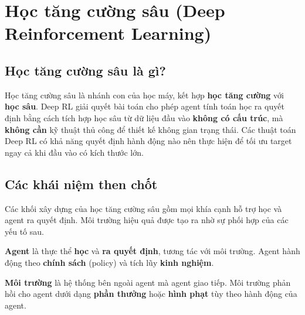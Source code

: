\section{Học tăng cường sâu (Deep Reinforcement Learning)}
\label{sec:deep-reinforcement-learning}

\subsection{Học tăng cường sâu là gì?}

\begin{dinhnghia}[title={Deep Reinforcement Learning (Deep RL)}]
Học tăng cường sâu là nhánh con của học máy, kết hợp \textbf{học tăng cường} với \textbf{học sâu}.
Deep RL giải quyết bài toán cho phép agent tính toán học ra quyết định bằng cách tích hợp học sâu từ dữ liệu đầu vào \textbf{không có cấu trúc}, mà \textbf{không cần} kỹ thuật thủ công để thiết kế không gian trạng thái.
Các thuật toán Deep RL có khả năng quyết định hành động nào nên thực hiện để tối ưu target ngay cả khi đầu vào có kích thước lớn.
\end{dinhnghia}

\subsection{Các khái niệm then chốt}

\begin{ynghia}[title={Khối xây dựng Deep RL}]
Các khối xây dựng của học tăng cường sâu gồm mọi khía cạnh hỗ trợ học và agent ra quyết định.
Môi trường hiệu quả được tạo ra nhờ sự phối hợp của các yếu tố sau.
\end{ynghia}

\begin{dinhnghia}[title={Agent (Tác tử)}]
\textbf{Agent} là thực thể \textbf{học} và \textbf{ra quyết định}, tương tác với môi trường.
Agent hành động theo \textbf{chính sách} (policy) và tích lũy \textbf{kinh nghiệm}.
\end{dinhnghia}

\begin{dinhnghia}[title={Environment (Môi trường)}]
\textbf{Môi trường} là hệ thống bên ngoài agent mà agent giao tiếp.
Môi trường phản hồi cho agent dưới dạng \textbf{phần thưởng} hoặc \textbf{hình phạt} tùy theo hành động của agent.
\end{dinhnghia}

